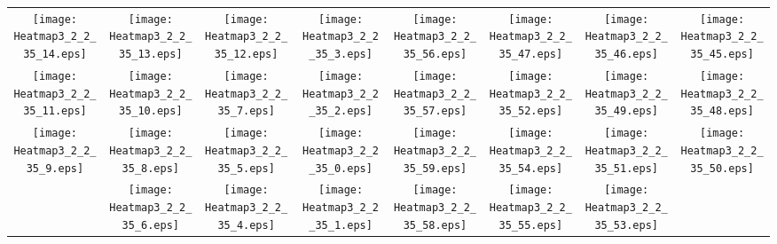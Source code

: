 \documentclass{standalone}
\begin{document}
\begin{tabular}{ *8{c} }
\texttt{[image: Heatmap3\_2\_2\_35\_14.eps]} & \texttt{[image: Heatmap3\_2\_2\_35\_13.eps]} & \texttt{[image: Heatmap3\_2\_2\_35\_12.eps]} & \texttt{[image: Heatmap3\_2\_2\_35\_3.eps]} & \texttt{[image: Heatmap3\_2\_2\_35\_56.eps]} & \texttt{[image: Heatmap3\_2\_2\_35\_47.eps]} & \texttt{[image: Heatmap3\_2\_2\_35\_46.eps]} & \texttt{[image: Heatmap3\_2\_2\_35\_45.eps]} \\
\texttt{[image: Heatmap3\_2\_2\_35\_11.eps]} & \texttt{[image: Heatmap3\_2\_2\_35\_10.eps]} & \texttt{[image: Heatmap3\_2\_2\_35\_7.eps]} & \texttt{[image: Heatmap3\_2\_2\_35\_2.eps]} & \texttt{[image: Heatmap3\_2\_2\_35\_57.eps]} & \texttt{[image: Heatmap3\_2\_2\_35\_52.eps]} & \texttt{[image: Heatmap3\_2\_2\_35\_49.eps]} & \texttt{[image: Heatmap3\_2\_2\_35\_48.eps]} \\
\texttt{[image: Heatmap3\_2\_2\_35\_9.eps]} & \texttt{[image: Heatmap3\_2\_2\_35\_8.eps]} & \texttt{[image: Heatmap3\_2\_2\_35\_5.eps]} & \texttt{[image: Heatmap3\_2\_2\_35\_0.eps]} & \texttt{[image: Heatmap3\_2\_2\_35\_59.eps]} & \texttt{[image: Heatmap3\_2\_2\_35\_54.eps]} & \texttt{[image: Heatmap3\_2\_2\_35\_51.eps]} & \texttt{[image: Heatmap3\_2\_2\_35\_50.eps]} \\
 & \texttt{[image: Heatmap3\_2\_2\_35\_6.eps]} & \texttt{[image: Heatmap3\_2\_2\_35\_4.eps]} & \texttt{[image: Heatmap3\_2\_2\_35\_1.eps]} & \texttt{[image: Heatmap3\_2\_2\_35\_58.eps]} & \texttt{[image: Heatmap3\_2\_2\_35\_55.eps]} & \texttt{[image: Heatmap3\_2\_2\_35\_53.eps]} &  
\end{tabular}
\end{document}
